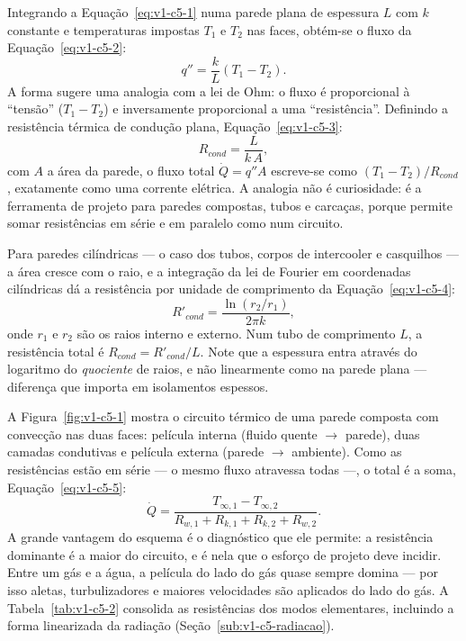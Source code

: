 \documentclass[12pt,a4paper]{article}
\numberwithin{equation}{section}
\numberwithin{table}{section}
\numberwithin{figure}{section}
\begin{document}
Integrando a Equação~\eqref{eq:v1-c5-1} numa parede plana de espessura $L$
com $k$ constante e temperaturas impostas $T_1$ e $T_2$ nas faces, obtém-se o
fluxo da Equação~\eqref{eq:v1-c5-2}:
\begin{equation}\label{eq:v1-c5-2}
q'' = \frac{k}{L}(T_1 - T_2).
\end{equation}
A forma sugere uma analogia com a lei de Ohm: o fluxo é proporcional à
``tensão'' ($T_1 - T_2$) e inversamente proporcional a uma ``resistência''.
Definindo a resistência térmica de condução plana, Equação~\eqref{eq:v1-c5-3}:
\begin{equation}\label{eq:v1-c5-3}
R_{cond} = \frac{L}{k\,A},
\end{equation}
com $A$ a área da parede, o fluxo total $\dot{Q} = q''A$ escreve-se como
$(T_1 - T_2)/R_{cond}$, exatamente como uma corrente elétrica. A analogia
não é curiosidade: é a ferramenta de projeto para paredes compostas, tubos e
carcaças, porque permite somar resistências em série e em paralelo como num
circuito.

Para paredes cilíndricas --- o caso dos tubos, corpos de intercooler e
casquilhos --- a área cresce com o raio, e a integração da lei de Fourier em
coordenadas cilíndricas dá a resistência por unidade de comprimento da
Equação~\eqref{eq:v1-c5-4}:
\begin{equation}\label{eq:v1-c5-4}
R'_{cond} = \frac{\ln(r_2/r_1)}{2\pi k},
\end{equation}
onde $r_1$ e $r_2$ são os raios interno e externo. Num tubo de comprimento
$L$, a resistência total é $R_{cond} = R'_{cond}/L$. Note que a espessura
entra através do logaritmo do \emph{quociente} de raios, e não linearmente
como na parede plana --- diferença que importa em isolamentos espessos.

A Figura~\ref{fig:v1-c5-1} mostra o circuito térmico de uma parede composta
com convecção nas duas faces: película interna (fluido quente $\to$ parede),
duas camadas condutivas e película externa (parede $\to$ ambiente). Como as
resistências estão em série --- o mesmo fluxo atravessa todas ---, o total é
a soma, Equação~\eqref{eq:v1-c5-5}:
\begin{equation}\label{eq:v1-c5-5}
\dot{Q} = \frac{T_{\infty,1} - T_{\infty,2}}
{R_{w,1} + R_{k,1} + R_{k,2} + R_{w,2}} .
\end{equation}
A grande vantagem do esquema é o diagnóstico que ele permite: a resistência
dominante é a maior do circuito, e é nela que o esforço de projeto deve
incidir. Entre um gás e a água, a película do lado do gás quase sempre domina
--- por isso aletas, turbulizadores e maiores velocidades são aplicados do
lado do gás. A Tabela~\ref{tab:v1-c5-2} consolida as resistências dos modos
elementares, incluindo a forma linearizada da radiação
(Seção~\ref{sub:v1-c5-radiacao}).
\end{document}
